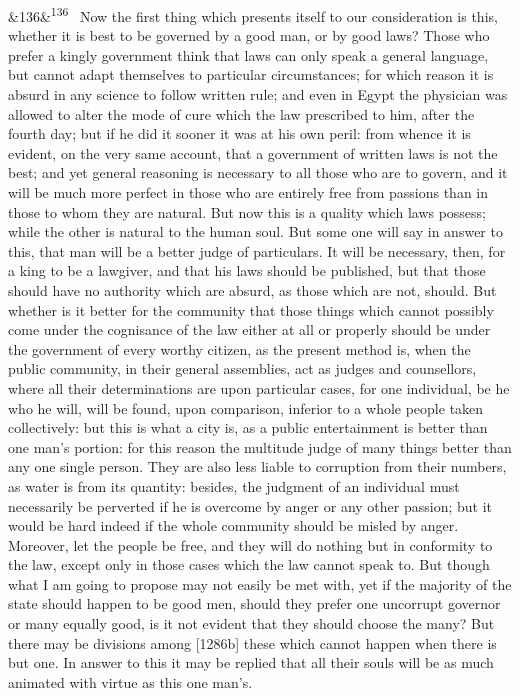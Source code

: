 \documentclass[12pt]{article}
\newcommand{\para}[1][]{\par\noindent\ifx&#1&\else\textsuperscript{\footnotesize #1}~\fi}
\begin{document}
\para[136] Now the first thing which presents itself to our consideration is this, whether it is best to be governed by a good man, or by good laws? Those who prefer a kingly government think that laws can only speak a general language, but cannot adapt themselves to particular circumstances; for which reason it is absurd in any science to follow written rule; and even in Egypt the physician was allowed to alter the mode of cure which the law prescribed to him, after the fourth day; but if he did it sooner it was at his own peril: from whence it is evident, on the very same account, that a government of written laws is not the best; and yet general reasoning is necessary to all those who are to govern, and it will be much more perfect in those who are entirely free from passions than in those to whom they are natural. But now this is a quality which laws possess; while the other is natural to the human soul. But some one will say in answer to this, that man will be a better judge of particulars. It will be necessary, then, for a king to be a lawgiver, and that his laws should be published, but that those should have no authority which are absurd, as those which are not, should. But whether is it better for the community that those things which cannot possibly come under the cognisance of the law either at all or properly should be under the government of every worthy citizen, as the present method is, when the public community, in their general assemblies, act as judges and counsellors, where all their determinations are upon particular cases, for one individual, be he who he will, will be found, upon comparison, inferior to a whole people taken collectively: but this is what a city is, as a public entertainment is better than one man's portion: for this reason the multitude judge of many things better than any one single person. They are also less liable to corruption from their numbers, as water is from its quantity: besides, the judgment of an individual must necessarily be perverted if he is overcome by anger or any other passion; but it would be hard indeed if the whole community should be misled by anger. Moreover, let the people be free, and they will do nothing but in conformity to the law, except only in those cases which the law cannot speak to. But though what I am going to propose may not easily be met with, yet if the majority of the state should happen to be good men, should they prefer one uncorrupt governor or many equally good, is it not evident that they should choose the many? But there may be divisions among [1286b] these which cannot happen when there is but one. In answer to this it may be replied that all their souls will be as much animated with virtue as this one man's.
\end{document}
